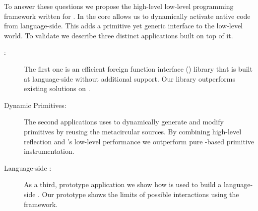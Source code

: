 To answer these questions we propose the high-level low-level programming framework \B written for \PH.
In the core \B allows us to dynamically activate native code from language-side.
This adds a primitive yet generic interface to the low-level \VM world.
To validate \B we describe three distinct applications built on top of it.
%
\begin{description}
	\item[\FFI:] The first one is an efficient foreign function interface (\FFI) library that is built at language-side without additional \VM support.
	Our \FFI library outperforms existing solutions on \PH.
	
	\item[Dynamic Primitives:] The second applications uses \B to dynamically generate and modify \PH primitives by reusing the metacircular \VM sources.
	By combining high-level reflection and \B's low-level performance we outperform pure \PH-based primitive instrumentation.
	
	\item[Language-side \JIT:] As a third, prototype application we show how \B is used to build a language-side \JIT.
	Our prototype shows the limits of possible \VM interactions using the \B framework. 
	
\end{description}


